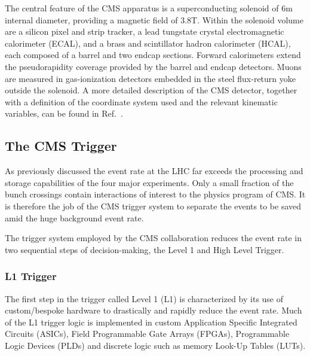 The central feature of the CMS apparatus is a superconducting solenoid of 6\unit{m} internal diameter, providing a magnetic field of 3.8\unit{T}. Within the solenoid volume are a silicon pixel and strip tracker, a lead tungstate crystal electromagnetic calorimeter (ECAL), and a brass and scintillator hadron calorimeter (HCAL), each composed of a barrel and two endcap sections. Forward calorimeters extend the pseudorapidity coverage provided by the barrel and endcap detectors. Muons are measured in gas-ionization detectors embedded in the steel flux-return yoke outside the solenoid. A more detailed description of the CMS detector, together with a definition of the coordinate system used and the relevant kinematic variables, can be found in Ref.~\cite{collaboration2008cms}. 




\subsection{The CMS Trigger}
As previously discussed the event rate at the LHC far exceeds the processing and storage capabilities of the four major experiments. 
Only a small fraction of the bunch crossings contain interactions of interest to the physics program of CMS. It is therefore the job of the CMS trigger system to separate the events to be saved amid the huge background event rate.
\par

The trigger system employed by the CMS collaboration reduces the event rate in two sequential steps of decision-making, the Level 1 and High Level Trigger.  


\subsubsection{L1 Trigger}
The first step in the trigger called Level 1 (L1) is characterized by its use of custom/bespoke hardware to drastically and rapidly reduce the event rate. Much of the L1 trigger logic is implemented in custom Application Specific Integrated Circuits (ASICs), Field Programmable Gate Arrays (FPGAs), Programmable Logic Devices (PLDs) and discrete logic such as memory Look-Up Tables (LUTs)\cite{cms2016cms,cms2020performance}.
\par

